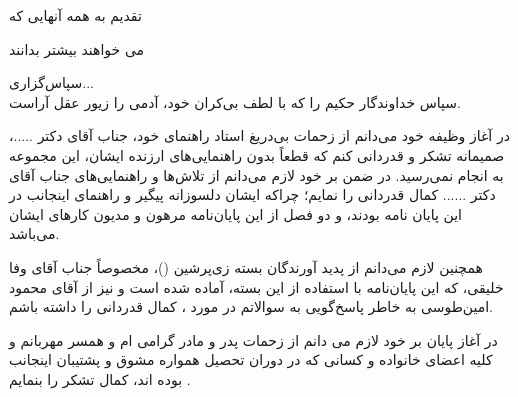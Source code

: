 \clearpage\newpage
 \thispagestyle{empty}
\vspace{4cm}

{\nastaliq
{\Huge
\hspace{1cm}
 تقدیم به همه آنهایی که 
\vspace{1.5cm}

\hspace{4cm}
می خواهند بیشتر بدانند
}}

\newpage



\newpage\thispagestyle{empty}
{\nastaliq
سپاس‌گزاری...
}
\\[2cm]
سپاس خداوندگار حکیم را که با لطف بی‌کران خود، آدمی را زیور عقل آراست.


در آغاز وظیفه‌  خود  می‌دانم از زحمات بی‌دریغ استاد  راهنمای خود،  جناب آقای دکتر  .....، صمیمانه تشکر و  قدردانی کنم  که قطعاً بدون  راهنمایی‌های ارزنده‌  ایشان، این مجموعه  به انجام  نمی‌رسید. در ضمن بر خود لازم می‌دانم از تلاش‌ها و راهنمایی‌های جناب آقای دکتر ...... کمال قدردانی را نمایم؛ چراکه ایشان دلسوزانه پیگیر و راهنمای اینجانب در این پایان نامه بودند، و دو فصل از این پایان‌نامه مرهون و مدیون کارهای ایشان می‌باشد. 


همچنین لازم می‌دانم از پدید آورندگان بسته زی‌پرشین (\lr{\XePersian})، مخصوصاً جناب آقای  وفا خلیقی، که این پایان‌نامه با استفاده از این بسته، آماده شده است و نیز از  آقای محمود امین‌طوسی به خاطر پاسخ‌گویی به سوالاتم  در مورد  \lr{\LaTeX}،  کمال قدردانی را داشته باشم.

در آغاز پایان بر خود لازم می دانم از زحمات پدر و مادر گرامی ام و همسر مهربانم و کلیه اعضای خانواده و کسانی که در دوران تحصیل همواره مشوق و پشتیبان اینجانب بوده اند، کمال تشکر را بنمایم .


